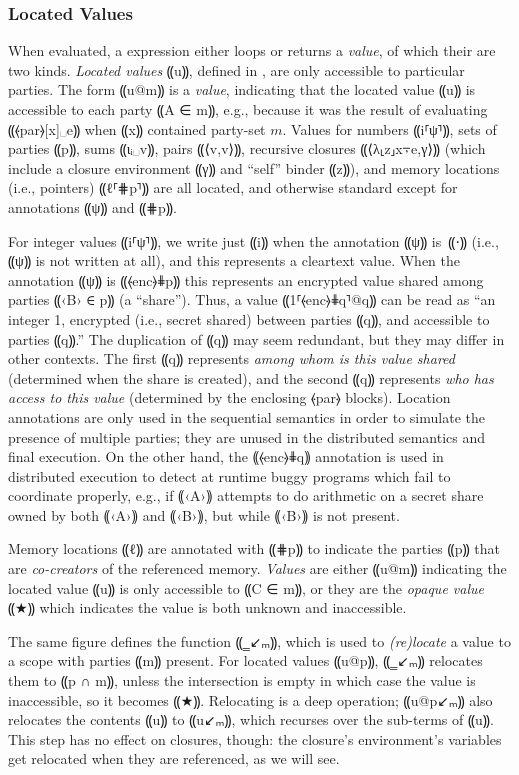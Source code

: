 \subsubsection{Located Values}
\label{subsubsec:mpc-design-seq-val}

When evaluated, a \mpc expression either loops or returns a \emph{value},
of which their are two kinds. \emph{Located values} ⸨u⸩, defined in
, are only accessible to particular parties. The form
⸨u@m⸩ is a \emph{value}, indicating that the located value ⸨u⸩ is
accessible to each party ⸨A ∈ m⸩, e.g., because it was the result of
evaluating ⸨⦑par⦒[x]␣e⸩ when ⸨x⸩ contained party-set $m$. Values for numbers ⸨i⸢ψ⸣⸩, sets of parties
⸨p⸩, sums ⸨ιᵢ␣v⸩, pairs ⸨⟨v,v⟩⸩, recursive closures ⸨⟨λ⸤z⸥x⍪e,γ⟩⸩ (which include
a closure environment ⸨γ⸩ and “self” binder ⸨z⸩), and memory locations (i.e.,
pointers) ⸨ℓ⸢⋕p⸣⸩ are all located, and otherwise standard except for annotations
⸨ψ⸩ and ⸨⋕p⸩.

For integer values ⸨i⸢ψ⸣⸩, we write just ⸨i⸩ when the annotation ⸨ψ⸩ is~⸨⋅⸩
(i.e., ⸨ψ⸩ is not written at all), and this represents a cleartext value. When
the annotation ⸨ψ⸩ is ⸨⦑enc⦒⋕p⸩ this represents an encrypted value shared among
parties ⸨‹B› ∈ p⸩ (a ``share''). Thus, a value ⸨1⸢⦑enc⦒⋕q⸣@q⸩ can be read as “an
integer 1, encrypted (i.e., secret shared) between parties ⸨q⸩, and accessible to parties
⸨q⸩.” The duplication of ⸨q⸩ may seem redundant, but they may differ
in other contexts. The first ⸨q⸩ represents \emph{among whom is this value shared}
(determined when the share is created), and the second ⸨q⸩ represents
\emph{who has access to this value} (determined by the enclosing ⦑par⦒ blocks).
Location annotations are only used in the sequential semantics in order to
simulate the presence of multiple parties; they are unused in the distributed
semantics and final execution. On the other hand, the ⸨⦑enc⦒⋕q⸩ annotation is
used in distributed execution to detect at runtime buggy programs which fail to
coordinate properly, e.g., if ⸨‹A›⸩ attempts to do arithmetic on a secret share
owned by both ⸨‹A›⸩ and ⸨‹B›⸩, but while ⸨‹B›⸩ is not present.

Memory locations ⸨ℓ⸩ are annotated with ⸨⋕p⸩ to indicate the parties
⸨p⸩ that are \emph{co-creators} of the referenced memory. \emph{Values}
are either ⸨u@m⸩ indicating the located value ⸨u⸩ is only accessible to ⸨C ∈ m⸩,
or they are the \emph{opaque value} ⸨★⸩ which indicates the value is both
unknown and inaccessible.

The same figure defines the function ⸨‗↙ₘ⸩, which is used to \emph{(re)locate} a
value to a scope with parties ⸨m⸩ present. For located values ⸨u@p⸩, ⸨‗↙ₘ⸩
relocates them to ⸨p ∩ m⸩, unless the intersection is empty in which case the
value is inaccessible, so it becomes ⸨★⸩. Relocating is a deep operation;
⸨u@p↙ₘ⸩ also relocates the contents ⸨u⸩ to ⸨u↙ₘ⸩, which recurses over
the sub-terms of ⸨u⸩. This step has no effect on closures, though: the closure's
environment's variables get relocated when they are referenced, as we will see.

